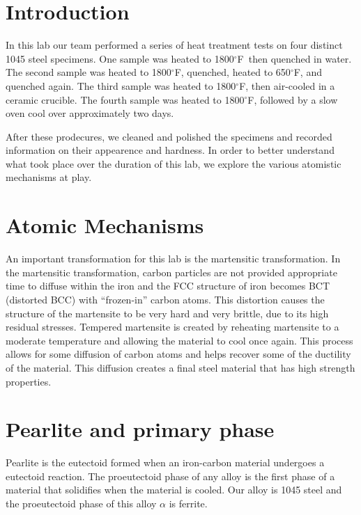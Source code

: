 \documentclass{article}
\newcommand{\YearPath}{../../../LatexConfig} %
\newcommand{\SemesterPath}{../../LatexConfig} %
\newcommand{\ClassPath}{../LatexConfig} %
\newcommand{\degf}{$^\circ $F}
\begin{document}




\section{Introduction}
In this lab our team performed a series of heat treatment tests on four distinct 1045 steel specimens. One sample was heated to 1800\degf~then quenched in water. The second sample was heated to 1800\degf, quenched, heated to 650\degf, and quenched again. The third sample was heated to 1800\degf, then air-cooled in a ceramic crucible. The fourth sample was heated to 1800\degf, followed by a slow oven cool over approximately two days.

After these prodecures, we cleaned and polished the specimens and recorded information on their appearence and hardness. In order to better understand what took place over the duration of this lab, we explore the various atomistic mechanisms at play.

\section{Atomic Mechanisms}
An important transformation for this lab is the martensitic transformation. In the martensitic transformation, carbon particles are not provided appropriate time to diffuse within the iron and the FCC structure of iron becomes BCT (distorted BCC) with ``frozen-in'' carbon atoms. \cite{book} This distortion causes the structure of the martensite to be very hard and very brittle, due to its high residual stresses. Tempered martensite is created by reheating martensite to a moderate temperature and allowing the material to cool once again. This process allows for some diffusion of carbon atoms and helps recover some of the ductility of the material. This diffusion creates a final steel material that has high strength properties.

\section{Pearlite and primary phase}
Pearlite is the eutectoid formed when an iron-carbon material undergoes a eutectoid reaction. The proeutectoid phase of any alloy is the first phase of a material that solidifies when the material is cooled. Our alloy is 1045 steel and the proeutectoid phase of this alloy $\alpha$ is ferrite.
\end{document}
